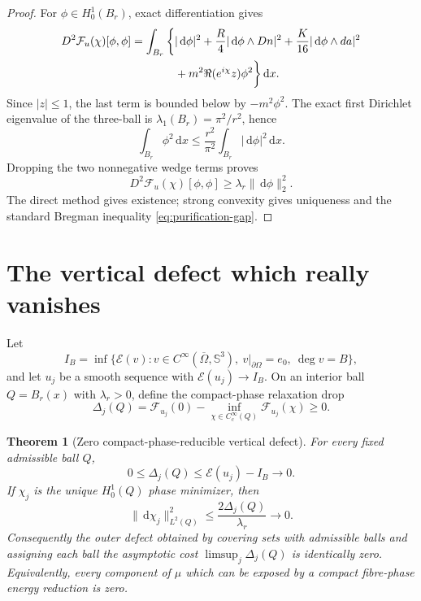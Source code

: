 \documentclass[11pt]{article}
\newtheorem{theorem}{Theorem}[section]
\newcommand{\dd}{\,\mathrm d}
\newcommand{\SSS}{\mathbb S}
\newcommand{\cE}{\mathcal E}
\begin{document}
\begin{proof}
For $\phi\in H^1_0(B_r)$, exact differentiation gives
\begin{align}
 D^2\mathcal F_u(\chi)[\phi,\phi]
 =\int_{B_r}\bigg\{&
 |\dd\phi|^2+\frac R4|\dd\phi\wedge Dn|^2
 +\frac K{16}|\dd\phi\wedge da|^2\notag\\
 &+m^2\Re(e^{i\chi}z)\phi^2\bigg\}\dd x.             \label{eq:second-var}
\end{align}
Since $|z|\leq1$, the last term is bounded below by $-m^2\phi^2$.
The exact first Dirichlet eigenvalue of the three-ball is
$\lambda_1(B_r)=\pi^2/r^2$, hence
\begin{equation}
 \int_{B_r}\phi^2\dd x\leq\frac{r^2}{\pi^2}
 \int_{B_r}|\dd\phi|^2\dd x.
 \label{eq:poincare}
\end{equation}
Dropping the two nonnegative wedge terms proves
\[
 D^2\mathcal F_u(\chi)[\phi,\phi]\geq
 \lambda_r\|\dd\phi\|_2^2.
\]
The direct method gives existence; strong convexity gives uniqueness and
the standard Bregman inequality \eqref{eq:purification-gap}.
\end{proof}

\section{The vertical defect which really vanishes}

Let
\begin{equation}
 I_B=\inf\{\cE(v):v\in C^\infty(\overline\Omega,\SSS^3),\
 v|_{\partial\Omega}=e_0,\ \deg v=B\},
 \label{eq:IB}
\end{equation}
and let $u_j$ be a smooth sequence with $\cE(u_j)\to I_B$.  On an interior
ball $Q=B_r(x)$ with $\lambda_r>0$, define the compact-phase relaxation drop
\begin{equation}
 \Delta_j(Q)=\mathcal F_{u_j}(0)-
 \inf_{\chi\in C^\infty_c(Q)}\mathcal F_{u_j}(\chi)\geq0.
 \label{eq:drop}
\end{equation}

\begin{theorem}[Zero compact-phase-reducible vertical defect]
For every fixed admissible ball $Q$,
\begin{equation}
 0\leq\Delta_j(Q)\leq\cE(u_j)-I_B\longrightarrow0.
 \label{eq:drop-zero}
\end{equation}
If $\chi_j$ is the unique $H^1_0(Q)$ phase minimizer, then
\begin{equation}
 \|\dd\chi_j\|_{L^2(Q)}^2
 \leq\frac{2\Delta_j(Q)}{\lambda_r}\longrightarrow0.
 \label{eq:phase-zero}
\end{equation}
Consequently the outer defect obtained by covering sets with admissible
balls and assigning each ball the asymptotic cost
$\limsup_j\Delta_j(Q)$ is identically zero.  Equivalently, every component
of $\mu$ which can be exposed by a compact fibre-phase energy reduction is
zero.
\end{theorem}
\end{document}
